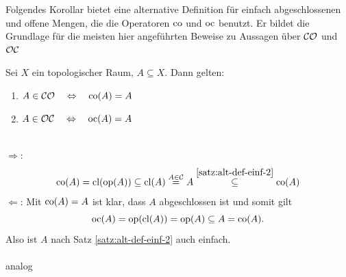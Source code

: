     Folgendes Korollar bietet eine alternative Definition für einfach abgeschlossenen und offene Mengen, die die Operatoren $\text{co}$ und $\text{oc}$ benutzt. Er bildet die Grundlage für die meisten hier angeführten Beweise zu Aussagen über $\mathcal{CO}$ und $\mathcal{OC}$
    \begin{kor}\label{kor:co(A)=A-oc(A)=A}
        Sei $X$ ein topologischer Raum, $A \subseteq X$. Dann gelten:
        \begin{enumerate}
            \item\label{satz:co(A)=A} $A \in \mathcal{CO} \quad \Leftrightarrow \quad \text{co}(A) = A$
            \item\label{satz:oc(A)=A} $A \in \mathcal{OC} \quad \Leftrightarrow \quad \text{oc}(A) = A$
        \end{enumerate}
    \end{kor}
    \begin{bew}
        \\ 
        \glqq $\boldsymbol{\Rightarrow}$\grqq:
        \begin{align*}
            \text{co}(A) = \text{cl}(\text{op}(A)) 
            \subseteq \text{cl}(A) 
            \overset{A \in \mathcal{C}}{=} A 
            \overset{\ref{satz:alt-def-einf-2}}{\subseteq} \text{co}(A)
        \end{align*}
        \glqq $\boldsymbol{\Leftarrow}$\grqq: Mit $\text{co}(A) = A$ ist klar, dass $A$ abgeschlossen ist und somit gilt $$\text{oc}(A) = \text{op}(\text{cl}(A)) = \text{op}(A) \subseteq A = \text{co}(A).$$ Also ist $A$ nach Satz \ref{satz:alt-def-einf-2} auch einfach.\\ \ \\
         analog
    \end{bew}
        
